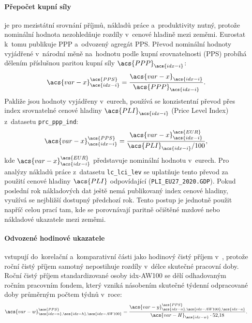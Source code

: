 \paragraph{Přepočet kupní síly}\label{par:pps_metodika} je pro mezistátní srovnání příjmů, nákladů práce a~produktivity nutný, protože 
nominální hodnota nezohledňuje rozdíly v~cenové hladině mezi zeměmi. Eurostat k~tomu publikuje 
\acf{PPP} a~odvozený agregát \acf{PPS}. Převod nominální hodnoty vyjádřené
v~národní měně na~hodnotu podle kupní srovnatelnosti (\acs{PPS}) probíhá dělením
příslušnou paritou kupní síly \(\acs{PPP}_{\acs{idx-i}}\):
\begin{equation}
  \acs{var-x}^{\acs{PPS}}_{\acs{idx-i}} = \frac{\acs{var-x}_{\acs{idx-i}}}{\acs{PPP}_{\acs{idx-i}}}.
  \label{eq:pps_konverze}
\end{equation}
Pakliže jsou hodnoty vyjádřeny v~eurech, používá se konzistentní převod přes
index srovnatelné cenové hladiny \(\acs{PLI}_{\acs{idx-i}}\) (Price Level Index) z~datasetu \texttt{prc\_ppp\_ind}:
\begin{equation}
  \acs{var-x}^{\acs{PPS}}_{\acs{idx-i}} = \frac{\acs{var-x}^{\acs{EUR}}_{\acs{idx-i}}}{\acs{PLI}_{\acs{idx-i}}/100},
  \label{eq:lci_eur_pps}
\end{equation}
kde \(\acs{var-x}^{\acs{EUR}}_{\acs{idx-i}}\) představuje nominální hodnotu v~eurech. Pro analýzy nákladů práce
z~datasetu \texttt{lc\_lci\_lev} se uplatňuje tento převod za použití cenové hladiny \(\acs{PLI}\) odpovídající  (\texttt{PLI\_EU27\_2020.GDP}).
Pokud poslední rok nákladových dat ještě nemá publikovaný index cenové hladiny, využívá se nejbližší dostupný předchozí rok. Tento postup
je jednotně použit napříč celou prací tam, kde se porovnávají paritně očištěné mzdové nebo nákladové ukazatele mezi zeměmi.\par

\paragraph{Odvozené hodinové ukazatele}\label{par:hodinove_ukazatele} vstupují do~korelační a~komparativní části jako hodinový čistý příjem v~,
protože roční čistý příjem samotný nepostihuje rozdíly v~délce skutečné pracovní
doby. Roční čistý příjem standardizované osoby \acs{idx-AW100} se dělí
odhadovaným ročním pracovním fondem, který vzniká násobením skutečné týdenní
odpracované doby průměrným počtem týdnů v~roce:
\begin{equation}
  \acs{var-w}^{\acs{PPS}}_{\acs{idx-n},\acs{idx-h},\acs{idx-AW100}}
    = \frac{\acs{var-y}^{\acs{PPS}}_{\acs{idx-n},\acs{idx-AW100},\acs{idx-a}}}
           {\acs{var-H}_{\acs{idx-w}} \cdot 52{,}18}.
  \label{eq:pps_hourly}
\end{equation}
\par

